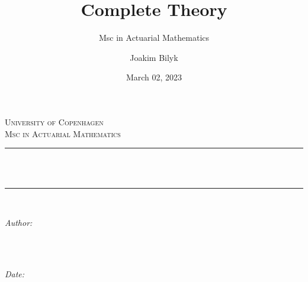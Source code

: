 \documentclass[
]{book}
\title{Complete Theory}
\subtitle{Msc in Actuarial Mathematics}
\author{Joakim Bilyk}
\date{March 02, 2023}
\begin{document}


{
\begin{titlepage}
\newcommand{\HRule}{\rule{\linewidth}{0.5mm}} %

\center %
 

\textsc{\LARGE University of Copenhagen}\\[4cm] %
\textsc{\Large Msc in Actuarial Mathematics}\\[0.5cm] %


\HRule \\[0.4cm]
{ \huge \bfseries \thetitle}\\[0.4cm] %
\HRule \\[1.5cm]
 

\begin{minipage}{0.4\textwidth}
\begin{flushleft} \large
\emph{Author:}\\
\textsc{\theauthor} \\
\end{flushleft}
\end{minipage}
~
\begin{minipage}{0.4\textwidth}
\begin{flushright} \large
\emph{Date:} \\
\textsc{\thedate} \\
\end{flushright}
\end{minipage}\\[2cm]


\end{titlepage}}
\end{document}
